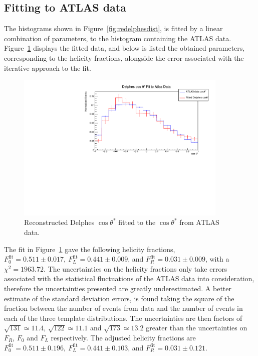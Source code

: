 \documentclass[12pt,a4paper]{article}
\numberwithin{equation}{section}
\begin{document}
\subsection{Fitting to ATLAS data}
The histograms shown in Figure~\ref{fig:redelphesdist}, is fitted by a linear
combination of parameters, to the histogram containing the ATLAS data.
Figure~\ref{fig:delphesfit} displays the fitted data, and below is listed the
obtained parameters, corresponding to the helicity fractions, alongside the
error associated with the iterative approach to the fit.

\begin{figure}[H]
  \centering
  \includegraphics[width=0.9\textwidth]{figures/delphes_fit}
  \caption{\label{fig:delphesfit}Reconstructed Delphes $\cos \theta^{*}$ fitted to
    the $\cos \theta^{*}$ from ATLAS data.}
\end{figure}
The fit in Figure~\ref{fig:delphesfit} gave the following helicity fractions,
$F_0^{\mathrm{fit}} = 0.511 \pm 0.017,\ F_L^{\mathrm{fit}} = 0.441 \pm 0.009$,
and $F_R^{\mathrm{fit}} = 0.031 \pm 0.009$, with a $\chi^2 = 1963.72$. The
uncertainties on the helicity fractions only take errors associated with the
statistical fluctuations of the ATLAS data into consideration, therefore the
uncertainties presented are greatly underestimated. A better estimate of the
standard deviation errors, is found taking the square of the fraction between
the number of events from data and the number of events in each of the three
template distributions. The uncertainties are then factors of
$\sqrt{131} \simeq 11.4$, $\sqrt{122} \simeq 11.1$ and $\sqrt{173} \simeq 13.2$ greater than
the uncertainties on $F_R$, $F_0$ and $F_L$ respectively. The adjusted helicity
fractions are
$F_0^{\mathrm{fit}} = 0.511 \pm 0.196,\ F_L^{\mathrm{fit}} = 0.441 \pm 0.103$,
and $F_R^{\mathrm{fit}} = 0.031 \pm 0.121$.
\end{document}
